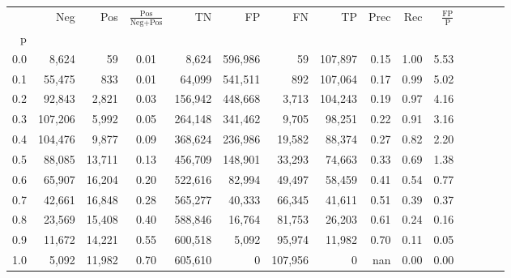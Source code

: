 \begin{tabular}{rrrcrrrrrrrrrrr}
\toprule
{} &      Neg &     Pos & $\frac{\text{Pos}}{\text{Neg}+\text{Pos}}$ &       TN &       FP &       FN &       TP &  Prec &   Rec & $\frac{\text{FP}}{\text{P}}$ \\
p   &          &         &                                            &          &          &          &          &       &       &                              \\
\midrule
0.0 &    8,624 &      59 &                                       0.01 &    8,624 &  596,986 &       59 &  107,897 &  0.15 &  1.00 &                         5.53 \\
0.1 &   55,475 &     833 &                                       0.01 &   64,099 &  541,511 &      892 &  107,064 &  0.17 &  0.99 &                         5.02 \\
0.2 &   92,843 &   2,821 &                                       0.03 &  156,942 &  448,668 &    3,713 &  104,243 &  0.19 &  0.97 &                         4.16 \\
0.3 &  107,206 &   5,992 &                                       0.05 &  264,148 &  341,462 &    9,705 &   98,251 &  0.22 &  0.91 &                         3.16 \\
0.4 &  104,476 &   9,877 &                                       0.09 &  368,624 &  236,986 &   19,582 &   88,374 &  0.27 &  0.82 &                         2.20 \\
0.5 &   88,085 &  13,711 &                                       0.13 &  456,709 &  148,901 &   33,293 &   74,663 &  0.33 &  0.69 &                         1.38 \\
0.6 &   65,907 &  16,204 &                                       0.20 &  522,616 &   82,994 &   49,497 &   58,459 &  0.41 &  0.54 &                         0.77 \\
0.7 &   42,661 &  16,848 &                                       0.28 &  565,277 &   40,333 &   66,345 &   41,611 &  0.51 &  0.39 &                         0.37 \\
0.8 &   23,569 &  15,408 &                                       0.40 &  588,846 &   16,764 &   81,753 &   26,203 &  0.61 &  0.24 &                         0.16 \\
0.9 &   11,672 &  14,221 &                                       0.55 &  600,518 &    5,092 &   95,974 &   11,982 &  0.70 &  0.11 &                         0.05 \\
1.0 &    5,092 &  11,982 &                                       0.70 &  605,610 &        0 &  107,956 &        0 &   nan &  0.00 &                         0.00 \\
\bottomrule
\end{tabular}

